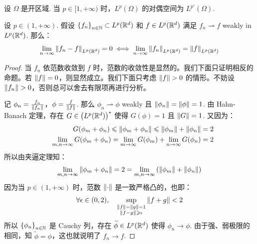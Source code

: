 \begin{theorem}[\(L^p\) duality]
	设 \(\Omega\) 是开区域. 当 \(p \in [1, +\infty)\) 时，\(L^{p}(\Omega)\) 的对偶空间为 \(L^{p'}(\Omega)\).
\end{theorem}

\begin{theorem}\label{thm: Radon-Riesz}
	设 \(p \in (1, +\infty)\). 假设 \(\left\{f_{n}\right\}_{n \in \mathbb{N}} \subset L^{p}(\mathbb{R}^{d})\) 和 \(f \in L^{p}(\mathbb{R}^{d})\) 满足 \(f_{n} \rightharpoonup f\) weakly in \(L^{p}(\mathbb{R}^{d})\). 那么：
	\begin{equation}
		\lim_{n\to\infty} \left\lVert f_{n} - f\right\rVert_{L^{p}(\mathbb{R}^{d})} = 0 
		\iff 
		\lim_{n\to\infty} \left\lVert f_{n}\right\rVert_{L^{p}(\mathbb{R}^{d})} = \left\lVert f\right\rVert_{L^{p}(\mathbb{R}^{d})} 
	\end{equation}

	\begin{proof}
		当 \(f_{n}\) 依范数收敛到 \(f\) 时，范数的收敛性是显然的。我们下面只证明相反的命题。若 \(\left\lVert f\right\rVert = 0\)，则显然成立。我们下面只考虑 \(\left\lVert f\right\rVert > 0\) 的情形。不妨设 \(\left\lVert f_{n}\right\rVert > 0\)，否则总可以舍去有限项再进行分析。

		记 \(\phi_{n} = \frac{f_{n}}{\left\lVert f_{n}\right\rVert}\)，\(\phi = \frac{f}{\left\lVert f\right\rVert}\). 那么 \(\phi_{n} \rightharpoonup \phi\) weakly 且 \(\left\lVert\phi_{n}\right\rVert = \left\lVert\phi\right\rVert = 1\). 由 Hahn-Banach 定理，存在 \(G \in \left(L^{p}(\mathbb{R}^{d})\right)^{\ast}\) 使得 \(G(\phi) = 1\) 且 \(\left\lVert G\right\rVert = 1\). 又因为：
		\begin{eqnarray*}
			&& G(\phi_m + \phi_n) 
			\leqslant \left\lVert\phi_m + \phi_n\right\rVert 
			\leqslant \left\lVert\phi_m\right\rVert + \left\lVert\phi_n\right\rVert 
			= 2 \\
			&& \lim_{m,n \to \infty} G(\phi_m + \phi_n) 
			= \lim_{m \to \infty} G(\phi_m) + \lim_{n \to \infty} G(\phi_n) 
			= 2
		\end{eqnarray*}
		所以由夹逼定理知：
		\begin{equation*}
			\lim_{m, n \to \infty} \left\lVert\phi_m + \phi_n\right\rVert 
			= 2 
			= \lim_{m, n \to \infty} \left(\left\lVert\phi_m\right\rVert + \left\lVert\phi_n\right\rVert\right)
		\end{equation*}
		因为当 \(p \in (1, +\infty)\) 时，范数 \(\left\lVert\cdot\right\rVert\) 是一致严格凸的，也即：
		\begin{equation*}
			\forall \epsilon \in (0, 2), \quad 
			\sup_{\substack{ \left\lVert f\right\rVert = \left\lVert g\right\rVert = 1 \\ \left\lVert f - g\right\rVert \geqslant \epsilon}} \left\lVert f + g\right\rVert < 2
		\end{equation*}
		所以 \(\left\{\phi_{n}\right\}_{n \in \mathbb{N}}\) 是 Cauchy 列，存在 \(\widetilde{\phi} \in L^{p}(\mathbb{R}^{d})\) 使得 \(\phi_{n} \to \phi\). 由于强、弱极限的相同，知 \(\widetilde{\phi} = \phi\)，这也就说明了 \(f_{n} \to f\).
	\end{proof}
\end{theorem}

